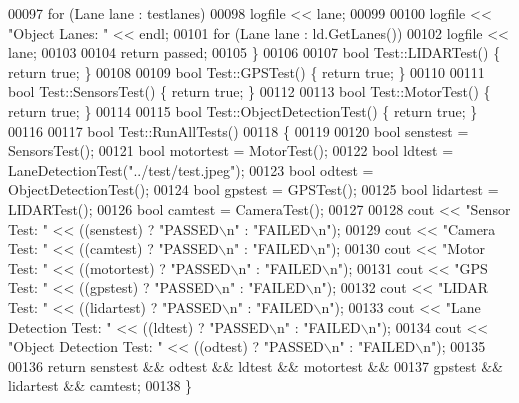\begin{DoxyCode}
00097   \textcolor{keywordflow}{for} (Lane lane : testlanes)
00098     logfile << lane;
00099 
00100   logfile << \textcolor{stringliteral}{"Object Lanes: "} << endl;
00101   \textcolor{keywordflow}{for} (Lane lane : ld.GetLanes())
00102     logfile << lane;
00103 
00104   \textcolor{keywordflow}{return} passed;
00105 \}
00106 
00107 \textcolor{keywordtype}{bool} Test::LIDARTest() \{ \textcolor{keywordflow}{return} \textcolor{keyword}{true}; \}
00108 
00109 \textcolor{keywordtype}{bool} Test::GPSTest() \{ \textcolor{keywordflow}{return} \textcolor{keyword}{true}; \}
00110 
00111 \textcolor{keywordtype}{bool} Test::SensorsTest() \{ \textcolor{keywordflow}{return} \textcolor{keyword}{true}; \}
00112 
00113 \textcolor{keywordtype}{bool} Test::MotorTest() \{ \textcolor{keywordflow}{return} \textcolor{keyword}{true}; \}
00114 
00115 \textcolor{keywordtype}{bool} Test::ObjectDetectionTest() \{ \textcolor{keywordflow}{return} \textcolor{keyword}{true}; \}
00116 
00117 \textcolor{keywordtype}{bool} Test::RunAllTests()
00118 \{
00119 
00120   \textcolor{keywordtype}{bool} senstest = SensorsTest();
00121   \textcolor{keywordtype}{bool} motortest = MotorTest();
00122   \textcolor{keywordtype}{bool} ldtest = LaneDetectionTest(\textcolor{stringliteral}{"../test/test.jpeg"});
00123   \textcolor{keywordtype}{bool} odtest = ObjectDetectionTest();
00124   \textcolor{keywordtype}{bool} gpstest = GPSTest();
00125   \textcolor{keywordtype}{bool} lidartest = LIDARTest();
00126   \textcolor{keywordtype}{bool} camtest = CameraTest();
00127 
00128   cout << \textcolor{stringliteral}{"Sensor Test: "} << ((senstest) ? \textcolor{stringliteral}{"PASSED\(\backslash\)n"} : \textcolor{stringliteral}{"FAILED\(\backslash\)n"});
00129   cout << \textcolor{stringliteral}{"Camera Test: "} << ((camtest) ? \textcolor{stringliteral}{"PASSED\(\backslash\)n"} : \textcolor{stringliteral}{"FAILED\(\backslash\)n"});
00130   cout << \textcolor{stringliteral}{"Motor Test: "} << ((motortest) ? \textcolor{stringliteral}{"PASSED\(\backslash\)n"} : \textcolor{stringliteral}{"FAILED\(\backslash\)n"});
00131   cout << \textcolor{stringliteral}{"GPS Test: "} << ((gpstest) ? \textcolor{stringliteral}{"PASSED\(\backslash\)n"} : \textcolor{stringliteral}{"FAILED\(\backslash\)n"});
00132   cout << \textcolor{stringliteral}{"LIDAR Test: "} << ((lidartest) ? \textcolor{stringliteral}{"PASSED\(\backslash\)n"} : \textcolor{stringliteral}{"FAILED\(\backslash\)n"});
00133   cout << \textcolor{stringliteral}{"Lane Detection Test: "} << ((ldtest) ? \textcolor{stringliteral}{"PASSED\(\backslash\)n"} : \textcolor{stringliteral}{"FAILED\(\backslash\)n"});
00134   cout << \textcolor{stringliteral}{"Object Detection Test: "} << ((odtest) ? \textcolor{stringliteral}{"PASSED\(\backslash\)n"} : \textcolor{stringliteral}{"FAILED\(\backslash\)n"});
00135 
00136   \textcolor{keywordflow}{return} senstest && odtest && ldtest && motortest &&
00137          gpstest && lidartest && camtest;
00138 \}
\end{DoxyCode}
